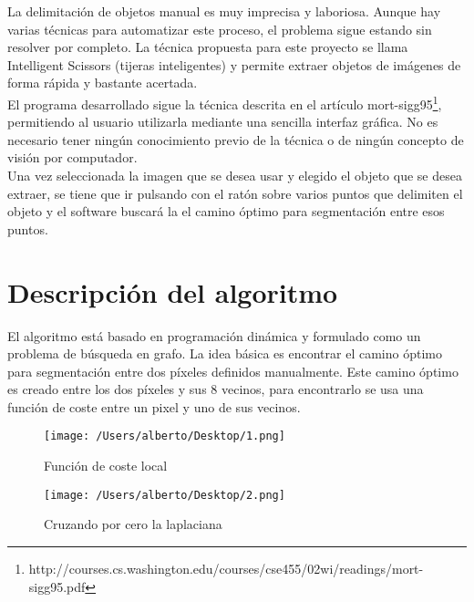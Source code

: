 La delimitación de objetos manual es muy imprecisa y laboriosa. Aunque hay varias técnicas para automatizar este proceso, el problema sigue estando sin resolver por completo. La técnica propuesta para este proyecto se llama Intelligent Scissors (tijeras inteligentes) y permite extraer objetos de imágenes de forma rápida y bastante acertada.  \\

El programa desarrollado sigue la técnica descrita en el artículo mort-sigg95\footnote{http://courses.cs.washington.edu/courses/cse455/02wi/readings/mort-sigg95.pdf}, permitiendo al usuario utilizarla mediante una sencilla interfaz gráfica. No es necesario tener ningún conocimiento previo de la técnica o de ningún concepto de visión por computador.  \\

Una vez seleccionada la imagen que se desea usar y elegido el objeto que se desea extraer, se tiene que ir pulsando con el ratón sobre varios puntos que delimiten el objeto y el software buscará la el camino óptimo para segmentación entre esos puntos.


\section{Descripción del algoritmo}

El algoritmo está basado en programación dinámica y formulado como un problema de búsqueda en grafo. La idea básica es encontrar el camino óptimo para segmentación entre dos píxeles definidos manualmente. Este camino óptimo es creado entre los dos píxeles y sus 8 vecinos, para encontrarlo se usa una función de coste entre un pixel y uno de sus vecinos. \\

\begin{figure}[H] %
\centering
\texttt{[image: /Users/alberto/Desktop/1.png]}  %
\label{kk1}
\caption{Función de coste local} 
\end{figure}

\begin{figure}[H] %
\centering
\texttt{[image: /Users/alberto/Desktop/2.png]}  %
\label{kk1}
\caption{Cruzando por cero la laplaciana} 
\end{figure}

